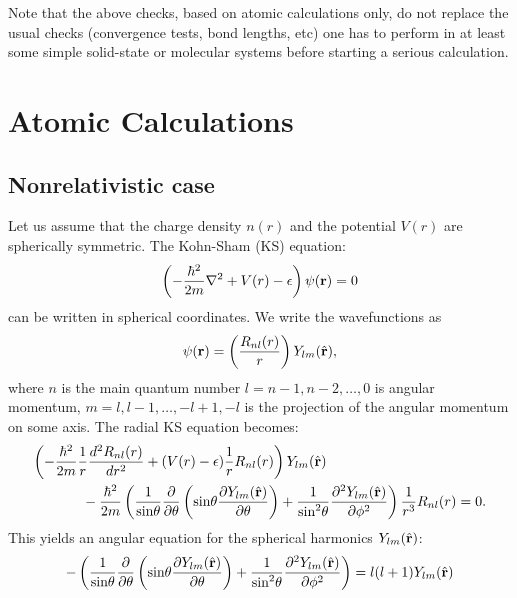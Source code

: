 Note that the above checks, based on atomic calculations only,
do not replace the usual checks (convergence tests, bond lengths,
etc) one has to perform in at least some simple solid-state or 
molecular systems before starting a serious calculation.

\appendix

\section{Atomic Calculations}

\subsection{Nonrelativistic case}

Let us assume that the charge density $n(r)$ and the potential $V(r)$
are spherically symmetric. The Kohn-Sham (KS) equation:
\begin{equation}
\left(-{\hbar^2\over 2m}\nabla^2 + V(r)-\epsilon\right) \psi({\bf r})=0
\end{equation}
can be written in spherical coordinates. We write the wavefunctions as
\begin{equation}
\psi({\bf r})=\left({R_{nl}(r)\over r}\right)Y_{lm}(\hat{{\bf r}}),
\end{equation}
where $n$ is the main quantum 
number $l=n-1,n-2,\dots,0$ is angular momentum, $m=l,l-1,\dots,-l+1,-l$
is the projection of the angular momentum on some axis. 
The radial KS equation becomes:
\begin{eqnarray}
\left(-{\hbar^2\over 2m} {1\over r} {d^2 R_{nl}(r)\over dr^2}
      +(V(r)-\epsilon) {1\over r} R_{nl}(r)
\right) Y_{lm}(\hat\r) \hskip 4cm \nonumber \\ \mbox{} - 
{\hbar^2\over 2m} \left({1\over\mbox{sin}\theta}{\partial\over\partial\theta}
                        \left(\mbox{sin}\theta{\partial Y_{lm}(\hat\r)
                                               \over\partial\theta}\right)
                      + {1\over\mbox{sin}^2\theta}
                           {\partial^2Y_{lm}(\hat\r)\over\partial\phi^2}
                  \right) {1\over r^3} R_{nl}(r) = 0.
\end{eqnarray}
This yields an angular equation for the spherical harmonics $Y_{lm}(\hat{{\bf r}})$:
\begin{equation}
-\left({1\over\mbox{sin}\theta}{\partial\over\partial\theta}
       \left(\mbox{sin}\theta{\partial Y_{lm}(\hat{{\bf r}})\over\partial\theta}
       \right)
     + {1\over\mbox{sin}^2\theta}
                           {\partial^2Y_{lm}(\hat{{\bf r}})\over\partial\phi^2}
\right) = l(l+1)Y_{lm}(\hat{{\bf r}})
\end{equation}
